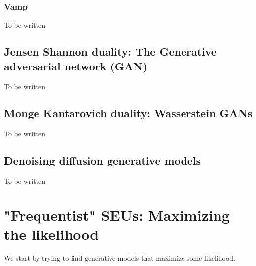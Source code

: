 \subsubsection{Vamp}

To be written


\subsection{Jensen Shannon duality: The Generative adversarial network (GAN)}

To be written

\subsection{Monge Kantarovich duality: Wasserstein GANs}

To be written

\subsection{Denoising diffusion generative models}

To be written




\section{"Frequentist" SEUs: Maximizing the likelihood}

We start by trying to find generative models that maximize some likelihood.
 
